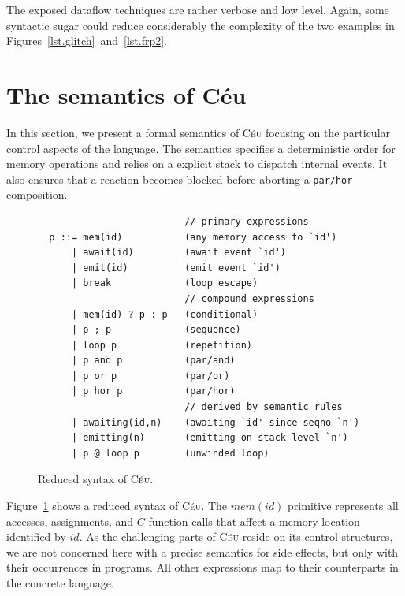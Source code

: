 \documentclass{acm_proc_article-sp}
\newcommand{\CEU}{\textsc{C\'{e}u}\xspace}
\newcommand{\code}[1] {{\small{\texttt{#1}}}}
\newcommand{\1}{\;}
\newcommand{\2}{\;\;}
\newcommand{\3}{\;\;\;}
\newcommand{\5}{\;\;\;\;\;}
\begin{document}
The exposed dataflow techniques are rather verbose and low level.
Again, some syntactic sugar could reduce considerably the complexity of the two 
examples in Figures~\ref{lst.glitch}~and~\ref{lst.frp2}.

\section{The semantics of C\'eu}
\label{sec.sem}

In this section, we present a formal semantics of \CEU focusing on the 
particular control aspects of the language.
The semantics specifies a deterministic order for memory operations and relies 
on a explicit stack to dispatch internal events.
It also ensures that a reaction becomes blocked before aborting a 
\code{par/hor} composition.

\begin{figure}[t]
{\small
\begin{verbatim}
                          // primary expressions
  p ::= mem(id)           (any memory access to `id')
      | await(id)         (await event `id')
      | emit(id)          (emit event `id')
      | break             (loop escape)
                          // compound expressions
      | mem(id) ? p : p   (conditional)
      | p ; p             (sequence)
      | loop p            (repetition)
      | p and p           (par/and)
      | p or p            (par/or)
      | p hor p           (par/hor)
                          // derived by semantic rules
      | awaiting(id,n)    (awaiting `id' since seqno `n')
      | emitting(n)       (emitting on stack level `n')
      | p @ loop p        (unwinded loop)
\end{verbatim}
}%
\caption{
    Reduced syntax of \CEU.
\label{lst.syntax}
}
\end{figure}

Figure~\ref{lst.syntax} shows a reduced syntax of \CEU.
The $mem(id)$ primitive represents all accesses, assignments, and $C$ function 
calls that affect a memory location identified by $id$.
As the challenging parts of \CEU reside on its control structures, we are not 
concerned here with a precise semantics for side effects, but only with their 
occurrences in programs.
%
All other expressions map to their counterparts in the concrete language.
\end{document}
